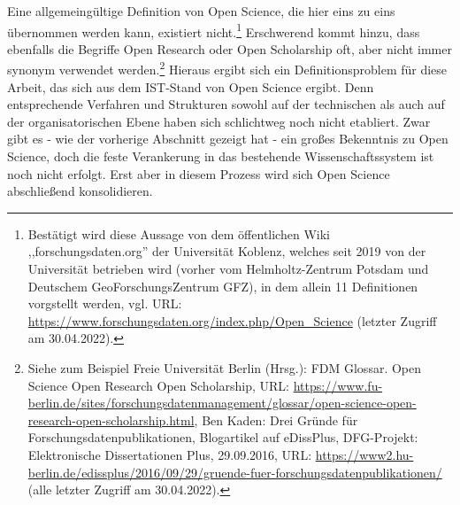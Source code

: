 Eine allgemeingültige Definition von Open Science, die hier eins zu eins übernommen werden kann, existiert nicht.\footnote{Bestätigt wird diese Aussage von dem öffentlichen Wiki ,,forschungsdaten.org'' der Universität Koblenz, welches seit 2019 von der Universität betrieben wird (vorher vom Helmholtz-Zentrum Potsdam und Deutschem GeoForschungsZentrum GFZ), in dem allein 11 Definitionen vorgstellt werden, vgl. URL: \url{https://www.forschungsdaten.org/index.php/Open_Science} (letzter Zugriff am 30.04.2022).} Erschwerend kommt hinzu, dass ebenfalls die Begriffe Open Research oder Open Scholarship oft, aber nicht immer synonym verwendet werden.\footnote{Siehe zum Beispiel Freie Universität Berlin (Hrsg.): FDM Glossar. Open Science\/ Open Research\/ Open Scholarship, URL: \url{https://www.fu-berlin.de/sites/forschungsdatenmanagement/glossar/open-science-open-research-open-scholarship.html}, Ben Kaden: Drei Gründe für Forschungsdatenpublikationen, Blogartikel auf eDissPlus, DFG-Projekt: Elektronische Dissertationen Plus, 29.09.2016, URL: \url{https://www2.hu-berlin.de/edissplus/2016/09/29/gruende-fuer-forschungsdatenpublikationen/} (alle letzter Zugriff am 30.04.2022).} Hieraus ergibt sich ein Definitionsproblem für diese Arbeit, das sich aus dem IST-Stand von Open Science ergibt. Denn entsprechende Verfahren und Strukturen sowohl auf der technischen als auch auf der organisatorischen Ebene haben sich schlichtweg noch nicht etabliert. Zwar gibt es - wie der vorherige Abschnitt gezeigt hat - ein großes Bekenntnis zu Open Science, doch die feste Verankerung in das bestehende Wissenschaftssystem ist noch nicht erfolgt. Erst aber in diesem Prozess wird sich Open Science abschließend konsolidieren. 

